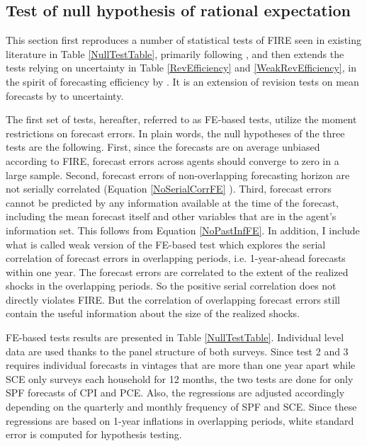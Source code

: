 \documentclass[12pt]{article}
\begin{document}
	
	\subsection{Test of null hypothesis of rational expectation}\label{NullTest}
	
	This section first reproduces a number of statistical tests of FIRE seen in existing literature in Table \ref{NullTestTable}, primarily following \citet{mankiw2003disagreement},  and then extends the tests relying on uncertainty in Table \ref{RevEfficiency} and \ref{WeakRevEfficiency}, in the spirit of forecasting efficiency by \citet{nordhaus1987forecasting}. It is an extension of revision tests on mean forecasts by \citet{fuhrer2018intrinsic} to uncertainty.  
	
	The first set of tests, hereafter, referred to as FE-based tests, utilize the moment restrictions on forecast errors. In plain words, the null hypotheses of the three tests are the following. First, since the forecasts are on average unbiased according to FIRE, forecast errors across agents should converge to zero in a large sample. Second, forecast errors of non-overlapping forecasting horizon are not serially correlated (Equation \ref{NoSerialCorrFE} ).  Third, forecast errors cannot be predicted by any information available at the time of the forecast, including the mean forecast itself and other variables that are in the agent's information set. This follows from Equation \ref{NoPastInfFE}. In addition, I include what is called weak version of the FE-based test which explores the serial correlation of forecast errors in overlapping periods,  i.e. 1-year-ahead forecasts within one year. The forecast errors are correlated to the extent of the realized shocks in the overlapping periods. So the positive serial correlation does not directly violates FIRE. But the correlation of overlapping forecast errors still contain the useful information about the size of the realized shocks. 
	
	FE-based tests results are presented in Table \ref{NullTestTable}. Individual level data are used thanks to the panel structure of both surveys. Since test 2 and 3 requires individual forecasts in vintages that are more than one year apart while SCE only surveys each household for 12 months, the two tests are done for only SPF forecasts of CPI and PCE. Also, the regressions are adjusted accordingly depending on the quarterly and monthly frequency of SPF and SCE. Since these regressions are based on 1-year inflations in overlapping periods, white standard error is computed for hypothesis testing. 
	
\end{document}
